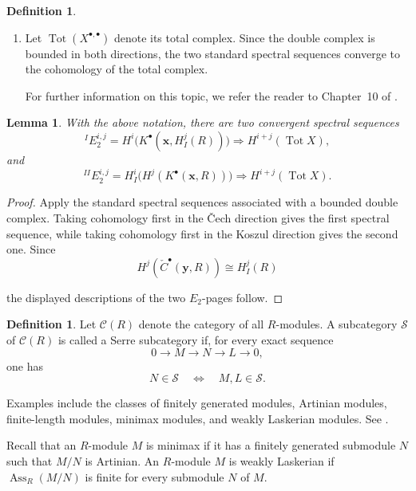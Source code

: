 \documentclass[12pt,twoside, final]{amsart}
\numberwithin{equation}{section}
\newtheorem{lemma}[theorem]{Lemma}
\theoremstyle{definition}
\newtheorem{definition}[theorem]{Definition}
\newcommand{\Ass}{\operatorname{Ass}}
\begin{document}
\begin{definition}
\begin{enumerate}
\[\begin{array}{ccccccccc}
 & & \uparrow & & \uparrow & & & & \uparrow \\

 & & 0 & & 0 & &   & & 0
\end{array}
\]


\item
Let $\operatorname{Tot}(X^{\bullet,\bullet})$ denote its total
complex. Since the double complex is bounded in both directions, the
two standard spectral sequences converge to the cohomology of the
total complex.

For further information on this topic, we refer the reader to Chapter~10 of \cite{r}.
\end{enumerate}
\end{definition}
\begin{lemma}\label{lem:ss}
With the above notation, there are two convergent spectral sequences
\[
{}^IE_2^{i,j}
=
H^i\bigl(K^\bullet(\mathbf x,H_I^j(R))\bigr)
\Longrightarrow
H^{i+j}(\operatorname{Tot}X),
\]
and
\[
{}^{II}E_2^{i,j}
=
H_I^i\bigl(H^j(K^\bullet(\mathbf x,R))\bigr)
\Longrightarrow
H^{i+j}(\operatorname{Tot}X).
\]
\end{lemma}

\begin{proof}
Apply the standard spectral sequences associated with a bounded
double complex. Taking cohomology first in the \v{C}ech direction
gives the first spectral sequence, while taking cohomology first in
the Koszul direction gives the second one. Since
\[
H^j(\check C^\bullet(\mathbf y,R))\cong H_I^j(R)
\]
 
the displayed descriptions of the two $E_2$-pages follow.
\end{proof}

\begin{definition}
Let $\mathcal C(R)$ denote the category of all $R$-modules. A
subcategory $\mathcal S$ of $\mathcal C(R)$ is called a Serre
subcategory if, for every exact sequence
\[
0\longrightarrow M\longrightarrow N\longrightarrow L
\longrightarrow0,
\]
one has
\[
N\in\mathcal S
\quad\Longleftrightarrow\quad
M,L\in\mathcal S.
\]
\end{definition}

Examples include the classes of finitely generated modules, Artinian
modules, finite-length modules, minimax modules, and weakly
Laskerian modules. See \cite{DMA, Rudlof}.

Recall that an $R$-module $M$ is minimax if it has a finitely generated
submodule $N$ such that $M/N$ is Artinian. An $R$-module $M$ is
weakly Laskerian if 
$\Ass_R(M/N)$ 
is finite for every submodule $N$ of $M$.
\end{document}
